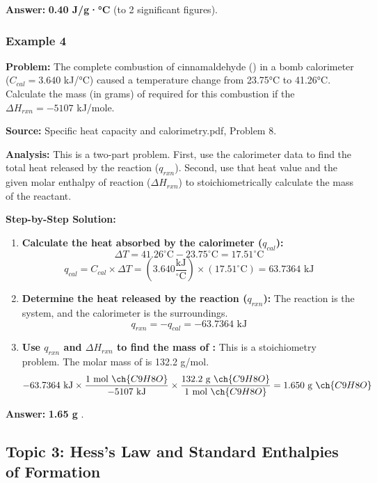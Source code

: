 \documentclass{article}
\begin{document}
\textbf{Answer:} \textbf{0.40 J/g·°C} (to 2 significant figures).

\subsubsection{Example 4}
\textbf{Problem:} The complete combustion of cinnamaldehyde () in a bomb calorimeter ($C_{cal} = 3.640$ kJ/°C) caused a temperature change from 23.75°C to 41.26°C. Calculate the mass (in grams) of  required for this combustion if the $\Delta H_{rxn} = -5107$ kJ/mole.

\textbf{Source:} Specific heat capacity and calorimetry.pdf, Problem 8.

\textbf{Analysis:} This is a two-part problem. First, use the calorimeter data to find the total heat released by the reaction ($q_{rxn}$). Second, use that heat value and the given molar enthalpy of reaction ($\Delta H_{rxn}$) to stoichiometrically calculate the mass of the reactant.

\textbf{Step-by-Step Solution:}
\begin{enumerate}
    \item \textbf{Calculate the heat absorbed by the calorimeter ($q_{cal}$):}
    \[ \Delta T = 41.26^\circ\text{C} - 23.75^\circ\text{C} = 17.51^\circ\text{C} \]
    \[ q_{cal} = C_{cal} \times \Delta T = (3.640 \frac{\text{kJ}}{^\circ\text{C}}) \times (17.51^\circ\text{C}) = 63.7364 \text{ kJ} \]
    \item \textbf{Determine the heat released by the reaction ($q_{rxn}$):} The reaction is the system, and the calorimeter is the surroundings.
    \[ q_{rxn} = -q_{cal} = -63.7364 \text{ kJ} \]
    \item \textbf{Use $q_{rxn}$ and $\Delta H_{rxn}$ to find the mass of :} This is a stoichiometry problem. The molar mass of  is 132.2 g/mol.
    \[ -63.7364 \text{ kJ} \times \frac{1 \text{ mol } \ch{C9H8O}}{-5107 \text{ kJ}} \times \frac{132.2 \text{ g } \ch{C9H8O}}{1 \text{ mol } \ch{C9H8O}} = 1.650 \text{ g } \ch{C9H8O} \]
\end{enumerate}

\textbf{Answer:} \textbf{1.65 g }.

\subsection{Topic 3: Hess's Law and Standard Enthalpies of Formation}
\end{document}
